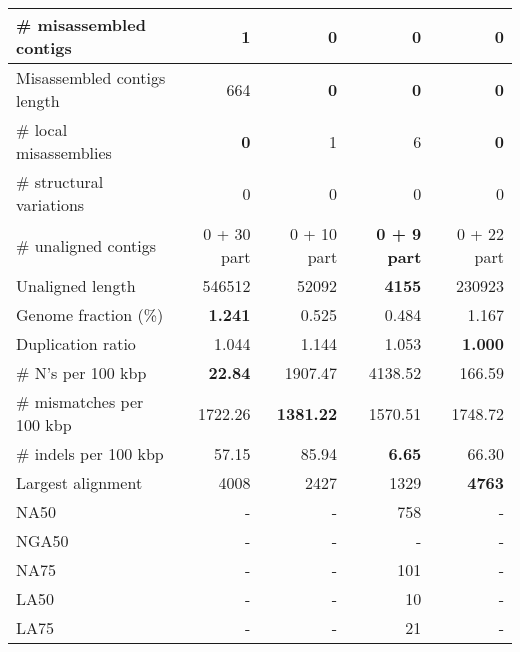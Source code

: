 \documentclass[12pt,a4paper]{article}
\begin{document}
\begin{table}[ht]
\begin{center}
\begin{tabular}{|l*{4}{|r}|}
\# misassembled contigs & 1 & {\bf 0} & {\bf 0} & {\bf 0} \\ \hline
Misassembled contigs length & 664 & {\bf 0} & {\bf 0} & {\bf 0} \\ \hline
\# local misassemblies & {\bf 0} & 1 & 6 & {\bf 0} \\ \hline
\# structural variations & 0 & 0 & 0 & 0 \\ \hline
\# unaligned contigs & 0 + 30 part & 0 + 10 part & {\bf 0 + 9 part} & 0 + 22 part \\ \hline
Unaligned length & 546512 & 52092 & {\bf 4155} & 230923 \\ \hline
Genome fraction (\%) & {\bf 1.241} & 0.525 & 0.484 & 1.167 \\ \hline
Duplication ratio & 1.044 & 1.144 & 1.053 & {\bf 1.000} \\ \hline
\# N's per 100 kbp & {\bf 22.84} & 1907.47 & 4138.52 & 166.59 \\ \hline
\# mismatches per 100 kbp & 1722.26 & {\bf 1381.22} & 1570.51 & 1748.72 \\ \hline
\# indels per 100 kbp & 57.15 & 85.94 & {\bf 6.65} & 66.30 \\ \hline
Largest alignment & 4008 & 2427 & 1329 & {\bf 4763} \\ \hline
NA50 & - & - & 758 & - \\ \hline
NGA50 & - & - & - & - \\ \hline
NA75 & - & - & 101 & - \\ \hline
LA50 & - & - & 10 & - \\ \hline
LA75 & - & - & 21 & - \\ \hline
\end{tabular}
\end{center}
\end{table}
\end{document}
